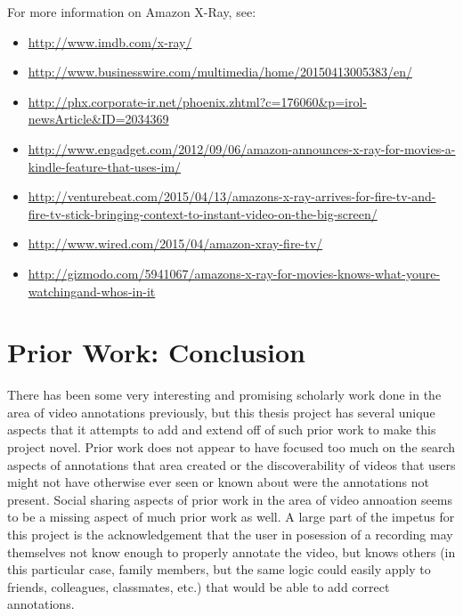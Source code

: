 For more information on Amazon X-Ray, see: 

\begin{itemize}[noitemsep]
\item \url{http://www.imdb.com/x-ray/}
\item \url{http://www.businesswire.com/multimedia/home/20150413005383/en/}
\item \url{http://phx.corporate-ir.net/phoenix.zhtml?c=176060&p=irol-newsArticle&ID=2034369}
\item \url{http://www.engadget.com/2012/09/06/amazon-announces-x-ray-for-movies-a-kindle-feature-that-uses-im/}
\item \url{http://venturebeat.com/2015/04/13/amazons-x-ray-arrives-for-fire-tv-and-fire-tv-stick-bringing-context-to-instant-video-on-the-big-screen/}
\item \url{http://www.wired.com/2015/04/amazon-xray-fire-tv/}
\item \url{http://gizmodo.com/5941067/amazons-x-ray-for-movies-knows-what-youre-watchingand-whos-in-it}
\end{itemize}








\section{Prior Work: Conclusion}
\label{sec:priorwork:conclusion}

There has been some very interesting and promising scholarly work done in the area of video annotations previously, but this thesis project has several unique aspects that it attempts to add and extend off of such prior work to make this project novel. Prior work does not appear to have focused too much on the search aspects of annotations that area created or the discoverability of videos that users might not have otherwise ever seen or known about were the annotations not present.  Social sharing aspects of prior work in the area of video annoation seems to be a missing aspect of much prior work as well.  A large part of the impetus for this project is the acknowledgement that the user in posession of a recording may themselves not know enough to properly annotate the video, but knows others (in this particular case, family members, but the same logic could easily apply to friends, colleagues, classmates, etc.) that would be able to add correct annotations.

